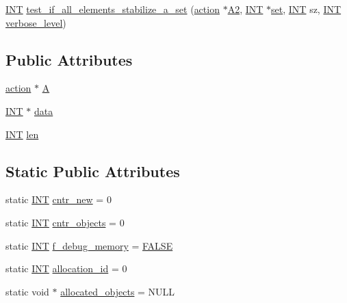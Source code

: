 \begin{DoxyCompactItemize}
\item 
\mbox{\hyperlink{galois_8h_a09fddde158a3a20bd2dcadb609de11dc}{I\+NT}} \mbox{\hyperlink{classvector__ge_adb89a5c50a3d216d602ecebfb135a4ff}{test\+\_\+if\+\_\+all\+\_\+elements\+\_\+stabilize\+\_\+a\+\_\+set}} (\mbox{\hyperlink{classaction}{action}} $\ast$\mbox{\hyperlink{simeon_8_c_a13fda35b8976a20080ec22b9d9e44e5b}{A2}}, \mbox{\hyperlink{galois_8h_a09fddde158a3a20bd2dcadb609de11dc}{I\+NT}} $\ast$\mbox{\hyperlink{nauty_8h_a9690bea211101f22a5e154087590c3da}{set}}, \mbox{\hyperlink{galois_8h_a09fddde158a3a20bd2dcadb609de11dc}{I\+NT}} sz, \mbox{\hyperlink{galois_8h_a09fddde158a3a20bd2dcadb609de11dc}{I\+NT}} \mbox{\hyperlink{simeon_8_c_a818073fbcc2f439e7c56952f67386122}{verbose\+\_\+level}})
\end{DoxyCompactItemize}
\subsection*{Public Attributes}
\begin{DoxyCompactItemize}
\item 
\mbox{\hyperlink{classaction}{action}} $\ast$ \mbox{\hyperlink{classvector__ge_a0b3cff149005f761255906417b1f6d35}{A}}
\item 
\mbox{\hyperlink{galois_8h_a09fddde158a3a20bd2dcadb609de11dc}{I\+NT}} $\ast$ \mbox{\hyperlink{classvector__ge_a8f67f7bbeb4c59ec1f5b864d8ba34968}{data}}
\item 
\mbox{\hyperlink{galois_8h_a09fddde158a3a20bd2dcadb609de11dc}{I\+NT}} \mbox{\hyperlink{classvector__ge_abdbd74327212540bfa3f08b56e40543b}{len}}
\end{DoxyCompactItemize}
\subsection*{Static Public Attributes}
\begin{DoxyCompactItemize}
\item 
static \mbox{\hyperlink{galois_8h_a09fddde158a3a20bd2dcadb609de11dc}{I\+NT}} \mbox{\hyperlink{classvector__ge_a423d17fe91fb32b5e47562ba0e0e38a6}{cntr\+\_\+new}} = 0
\item 
static \mbox{\hyperlink{galois_8h_a09fddde158a3a20bd2dcadb609de11dc}{I\+NT}} \mbox{\hyperlink{classvector__ge_aae9fd368da6c39e13f71c488fecf5236}{cntr\+\_\+objects}} = 0
\item 
static \mbox{\hyperlink{galois_8h_a09fddde158a3a20bd2dcadb609de11dc}{I\+NT}} \mbox{\hyperlink{classvector__ge_aab3e70b379a01edc1bac29ee39ff5be0}{f\+\_\+debug\+\_\+memory}} = \mbox{\hyperlink{nauty_8h_aa93f0eb578d23995850d61f7d61c55c1}{F\+A\+L\+SE}}
\item 
static \mbox{\hyperlink{galois_8h_a09fddde158a3a20bd2dcadb609de11dc}{I\+NT}} \mbox{\hyperlink{classvector__ge_a944ec33149525251e5585f7796a85b7c}{allocation\+\_\+id}} = 0
\item 
static void $\ast$ \mbox{\hyperlink{classvector__ge_a62c6cce667643e45937abd140918d4c4}{allocated\+\_\+objects}} = N\+U\+LL
\end{DoxyCompactItemize}


